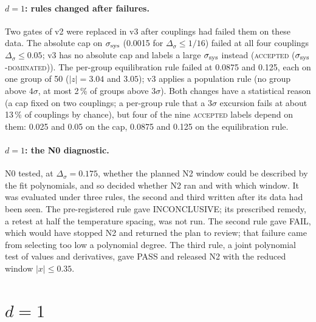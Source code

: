 \documentclass[10pt,a4paper]{article}
\newcommand{\Ds}{\Delta_\sigma}
\newcommand{\lbl}[1]{{\mdseries\scshape #1}}
\newcommand{\ssys}{\sigma_{\rm sys}}
\begin{document}
\paragraph{$d=1$: rules changed after failures.} Two gates of v2 were replaced in v3 after couplings had failed them on these data. The
absolute cap on $\ssys$ (0.0015 for $\Ds\le1/16$) failed at all four couplings $\Ds\le0.05$; v3 has no absolute cap and labels a large $\ssys$
instead (\lbl{accepted ($\ssys$-dominated)}). The per-group equilibration rule failed at 0.0875 and 0.125, each on one group of 50 ($|z|=3.04$ and
$3.05$); v3 applies a population rule (no group above $4\sigma$, at most 2\,\% of groups above $3\sigma$). Both changes have a statistical
reason (a cap fixed on two couplings; a per-group rule that a $3\sigma$ excursion fails at about 13\,\% of couplings by chance), but four of the
nine \lbl{accepted} labels depend on them: 0.025 and 0.05 on the cap, 0.0875 and 0.125 on the equilibration rule.

\paragraph{$d=1$: the N0 diagnostic.} N0 tested, at $\Ds=0.175$, whether the planned N2 window could be described by the fit polynomials, and
so decided whether N2 ran and with which window. It was evaluated under three rules, the second and third written after its data had been
seen. The pre-registered rule gave INCONCLUSIVE; its prescribed remedy, a retest at half the temperature spacing, was not run. The second
rule gave FAIL, which would have stopped N2 and returned the plan to review; that failure came from selecting too low a polynomial degree. The
third rule, a joint polynomial test of values and derivatives, gave PASS and released N2 with the reduced window $|x|\le0.35$.

\section{\texorpdfstring{$d=1$}{d=1}}\label{sec:1d}
\end{document}
